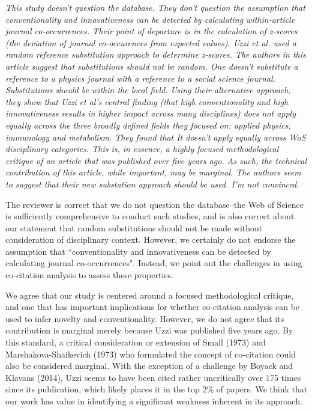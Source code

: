 \documentclass[11pt, oneside]{article}   	%
\begin{document}
\emph{ This study doesn't question the database. They don't question the assumption that conventionality and innovativeness can be detected by calculating within-article journal co-occurrences. Their point of departure is in the calculation of z-scores (the deviation of journal co-occurences from expected values). Uzzi et al. used a random reference substitution approach to determine z-scores. The authors in this article suggest that substitutions should not be random.  One doesn't substitute a reference to a physics journal with a reference to a social science journal.  Substitutions should be within the local field.  Using their alternative approach, they show that Uzzi et al's central finding (that high conventionality and high innovativeness results in higher impact across many disciplines) does not apply equally across the three broadly defined fields they focused on: applied physics, immunology and metabolism. They found that It doesn't apply equally across WoS disciplinary categories. This is, in essence, a highly focused methodological critique of an article that was published over five years ago.  As such, the technical contribution of this article, while important, may be marginal. The authors seem to suggest that their new substation approach should be used. I'm not convinced.}

The reviewer is correct that we do not question the database--the Web of Science is sufficiently comprehensive to conduct such studies, and is also correct about our statement that  random substitutions should not be made without consideration of  disciplinary context. However,  we certainly do not endorse  the assumption that  ``conventionality  and innovativeness can be detected by calculating journal co-occurrences". Instead, we point out the challenges in using co-citation analysis to assess these properties. 

We agree that our study is centered around a focused methodological critique, and one that has important implications for whether co-citation analysis can be used to infer novelty and conventionality. However, we do not agree that its contribution is marginal merely because Uzzi was published five years ago. By this standard, a critical consideration or extension of Small (1973) and Marshakova-Shaikevich (1973) who formulated the concept of co-citation could also be considered marginal. With the exception of a challenge by Boyack and Klavans (2014), Uzzi seems to have been cited rather uncritically over 175 times since its publication, which likely places it in the top 2\% of papers. We think that our work has value in identifying a significant weakness inherent in its approach.
\end{document}
